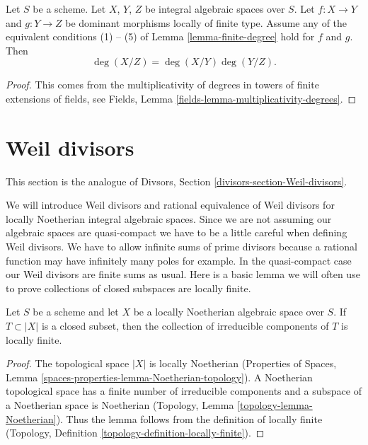 \begin{lemma}
\label{lemma-degree-composition}
Let $S$ be a scheme.
Let $X$, $Y$, $Z$ be integral algebraic spaces over $S$.
Let $f : X \to Y$ and $g : Y \to Z$ be dominant morphisms locally
of finite type. Assume any of the equivalent conditions
(1) -- (5) of Lemma \ref{lemma-finite-degree} hold for $f$ and $g$. Then
$$
\deg(X/Z) = \deg(X/Y) \deg(Y/Z).
$$
\end{lemma}

\begin{proof}
This comes from the multiplicativity of degrees in towers
of finite extensions of fields, see
Fields, Lemma \ref{fields-lemma-multiplicativity-degrees}.
\end{proof}










\section{Weil divisors}
\label{section-Weil-divisors}

\noindent
This section is the analogue of Divsors, Section
\ref{divisors-section-Weil-divisors}.

\medskip\noindent
We will introduce Weil divisors and rational equivalence of Weil
divisors for locally Noetherian integral algebraic spaces.
Since we are not assuming our algebraic spaces are quasi-compact we have
to be a little careful when defining Weil divisors. We have to allow
infinite sums of prime divisors because a rational function may have
infinitely many poles for example. In the quasi-compact case our
Weil divisors are finite sums as usual. Here is a basic lemma we will
often use to prove collections of closed subspaces are locally finite.

\begin{lemma}
\label{lemma-components-locally-finite}
Let $S$ be a scheme and let $X$ be a locally Noetherian
algebraic space over $S$. If $T \subset |X|$ is a closed subset,
then the collection of irreducible components of $T$ is locally finite.
\end{lemma}

\begin{proof}
The topological space $|X|$ is locally Noetherian
(Properties of Spaces, Lemma \ref{spaces-properties-lemma-Noetherian-topology}).
A Noetherian topological space has a finite number of
irreducible components and a subspace of a Noetherian space is Noetherian
(Topology, Lemma \ref{topology-lemma-Noetherian}).
Thus the lemma follows from the definition of locally finite
(Topology, Definition \ref{topology-definition-locally-finite}).
\end{proof}


